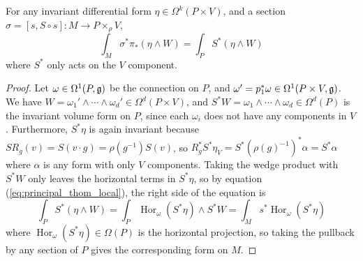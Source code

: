 \begin{prop}
	For any invariant differential form $\eta \in \Omega^k(P\times V)$, and a
	section $\sigma = [s,S\circ s] : M \to P\times_\rho V$, 
	\[
	\int_M\sigma^*\pi_* (\eta\wedge W) = \int_P S^*(\eta\wedge W)
	\] 
	where $S^*$ only acts on the  $V$ component.
\end{prop}
\begin{proof}
	Let $\omega \in \Omega^1(P,\operatorname{\mathfrak{g}})$ be the connection on  $P$, and
	$\omega'=p_1^*\omega \in \Omega^1(P\times V,\operatorname{\mathfrak{g}})$. We have 
	$W=\omega_1'\wedge\cdots\wedge\omega_d' \in \Omega^d(P\times V)$, 
	and $S^*W = \omega_1\wedge\cdots\wedge\omega_d\in\Omega^d(P)$ is
	the invariant volume form on  $P$, since each
	$\omega_i$ does not have any components in $V$. Furthermore, $S^*\eta$ is
	again invariant because $SR_g(v) = S(v\cdot g) =
	\rho(g^{-1}) S(v)$, so  
	$R_g^*S^*\eta_V = S^*(\rho(g)^{-1})^*\alpha =
	S^*\alpha$ where $\alpha$ is any form with only $V$ components.
	Taking the wedge product with $S^*W$ only leaves the horizontal terms in
	$S^*\eta$, so by equation
	(\ref{eq:principal_thom_local}), the right side of the equation is 
	\[
		\int_P S^*(\eta\wedge W)  
		= \int_P \operatorname{Hor}_{\omega}(S^*\eta)  \wedge S^*W
		= \int_M s^*\operatorname{Hor}_{\omega}(S^*\eta) 
	\] 
	where $\operatorname{Hor}_{\omega}(S^*\eta) \in \Omega(P)$ is the horizontal
	projection, so taking the pullback by any section of $P$ gives the
	corresponding form on $M$. 


\end{proof}
